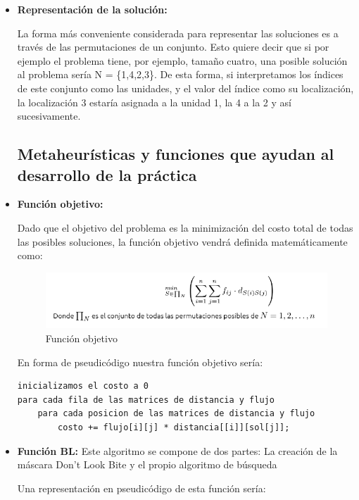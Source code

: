 \begin{itemize}
	\item \textbf{Representación de la solución: }
	
	La forma más conveniente considerada para representar las soluciones es a través de las permutaciones de un conjunto. Esto quiere decir que si por ejemplo el problema tiene, por ejemplo, tamaño cuatro, una posible solución al problema sería N = \{1,4,2,3\}. De esta forma, si interpretamos los índices de este conjunto como las unidades, y el valor del índice como su localización, la localización 3 estaría asignada a la unidad 1, la 4 a la 2 y así sucesivamente.
	
	\subsection{Metaheurísticas y funciones que ayudan al desarrollo de la práctica}
	
	\item \textbf{Función objetivo:}
	
	Dado que el objetivo del problema es la minimización del costo total de todas las posibles soluciones, la función objetivo vendrá definida matemáticamente como:
	
	\begin{figure}[H]
		\centering
		\includegraphics[scale=1.0]{Screenshot_2.png}
		\caption{Función objetivo}
		\label{}
	\end{figure}
	\newpage
	En forma de pseudicódigo nuestra función objetivo sería:
	
	\begin{lstlisting}[language=SH]
inicializamos el costo a 0
para cada fila de las matrices de distancia y flujo
	para cada posicion de las matrices de distancia y flujo
		costo += flujo[i][j] * distancia[[i]][sol[j]];

	\end{lstlisting}
	

			\item \textbf{Función BL:}
		Este algoritmo se compone de dos partes: La creación de la máscara Don't Look Bite y el propio algoritmo de búsqueda

			Una representación en pseudicódigo de esta función sería:
			

\end{itemize}
